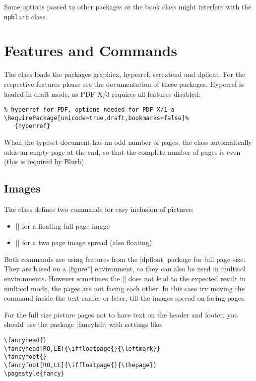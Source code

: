 \documentclass[english,10pt,bbook=pocketbig,inner=1cm,outer=2.5cm]{npblurb}
\begin{document}
\begin{alertbox}
Some options passed to other packages or the book class might interfere with the {\tt npblurb} class. 
\end{alertbox}

\chapter{Features and Commands}
The class loads the packages graphicx, hyperref, scrextend and dpfloat. For the respective features please see the documentation of these packages. Hyperref is loaded in draft mode, as PDF X/3 requires all features disabled:
\begin{Verbatim}
% hyperref for PDF, options needed for PDF X/1-a
\RequirePackage[unicode=true,draft,bookmarks=false]%
   {hyperref}
\end{Verbatim}

When the typeset document has an odd number of pages, the class automatically adds an empty page at the end, so that the complete number of pages is even (this is required by Blurb).

\section{Images}
The class defines two commands for easy inclusion of pictures:
\begin{itemize}\setlength{\itemsep}{0pt plus0pt minus0pt}
\item || for a floating full page image
\item || for a two page image spread (also floating)
\end{itemize}
Both commands are using features from the |dpfloat| package for full page size. They are based on a |figure*| environment, so they can also be used in multicol environments. However sometimes the |\twopageimage| does not lead to the expected result in multicol mode, the pages are not facing each other. In this case try moving the command inside the text earlier or later, till the images spread on facing pages.


For the full size picture pages not to have text on the header and footer, you should use the package |fancyhdr| with settings like:
\begin{Verbatim}
\fancyhead{}
\fancyhead[RO,LE]{\iffloatpage{}{\leftmark}}
\fancyfoot{}
\fancyfoot[RO,LE]{\iffloatpage{}{\thepage}}
\pagestyle{fancy}
\end{Verbatim} 
\end{document}
